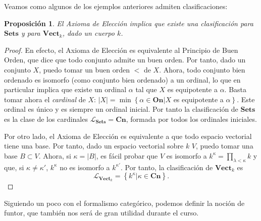 \documentclass[12pt,a4paper]{book}
\newtheorem{prop}[thm]{Proposición}
\theoremstyle{definition} \newtheorem{defn}[thm]{Definición}
\theoremstyle{definition} \newtheorem{ejemplo}[thm]{Ejemplo}
\theoremstyle{definition} \newtheorem{ejercicio}[thm]{Ejercicio}
\theoremstyle{remark} \newtheorem*{obs}{Observación}
\begin{document}
Veamos como algunos de los ejemplos anteriores admiten clasificaciones:
\begin{prop}
  El Axioma de Elección implica que existe una clasificación para $\mathbf{Sets}$ y para $\mathbf{Vect}_k$, dado un cuerpo $k$.
\end{prop}
\begin{proof}
  En efecto, el Axioma de Elección es equivalente al Principio de Buen Orden, que dice que todo conjunto admite un buen orden. Por tanto, dado un conjunto $X$, puedo tomar un buen orden $<$ de $X$. Ahora, todo conjunto bien ordenado es isomorfo (como conjunto bien ordenado) a un ordinal, lo que en particular implica que existe un ordinal $\alpha$ tal que $X$ es equipotente a $\alpha$. Basta tomar ahora el \emph{cardinal} de $X$: $|X|=\min\left\{ \alpha \in \mathbf{On} | X\right.$ es equipotente a $\left. \alpha \right\}$. Este ordinal es único y es siempre un ordinal inicial. Por tanto la clasificación de $\mathbf{Sets}$ es la clase de los cardinales $\mathcal{L}_{\mathbf{Sets}}=\mathbf{Cn}$, formada por todos los ordinales iniciales. 

  Por otro lado, el Axioma de Elección es equivalente a que todo espacio vectorial tiene una base. Por tanto, dado un espacio vectorial sobre $k$ $V$, puedo tomar una base $B\subset V$. Ahora, si $\kappa=|B|$, es fácil probar que $V$ es isomorfo a $k^{\kappa}=\prod_{\lambda < \kappa} k$ y que, si $\kappa \neq \kappa'$, $k^{\kappa}$ no es isomorfo a $k^{\kappa'}$. Por tanto, la clasificación de $\mathbf{Vect}_k$ es 
  \begin{equation*}
    \mathcal{L}_{\mathbf{Vect}_k}=\left\lbrace k^{\kappa} | \kappa \in \mathbf{Cn} \right\rbrace.
  \end{equation*}
\end{proof}

Siguiendo un poco con el formalismo categórico, podemos definir la noción de funtor, que también nos será de gran utilidad durante el curso.
\end{document}
